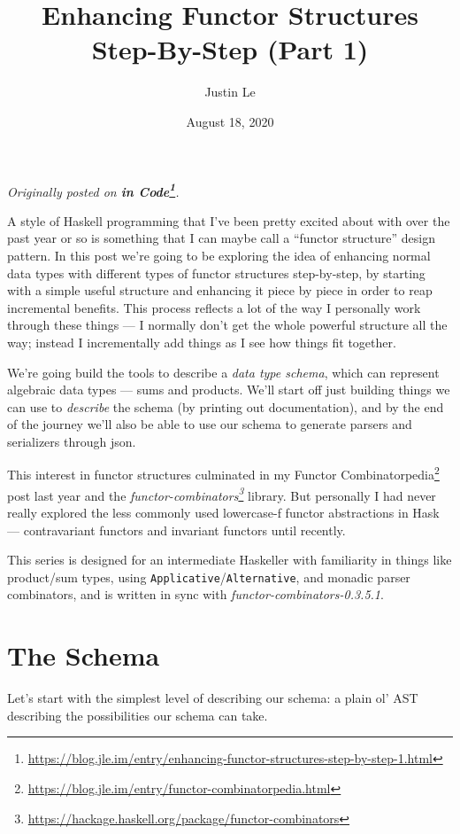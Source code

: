 \documentclass[]{article}
\title{Enhancing Functor Structures Step-By-Step (Part 1)}
\author{Justin Le}
\date{August 18, 2020}
\renewcommand{\href}[2]{#2\footnote{\url{#1}}}
\begin{document}
\maketitle

\emph{Originally posted on
\textbf{\href{https://blog.jle.im/entry/enhancing-functor-structures-step-by-step-1.html}{in
Code}}.}

A style of Haskell programming that I've been pretty excited about with over the
past year or so is something that I can maybe call a ``functor structure''
design pattern. In this post we're going to be exploring the idea of enhancing
normal data types with different types of functor structures step-by-step, by
starting with a simple useful structure and enhancing it piece by piece in order
to reap incremental benefits. This process reflects a lot of the way I
personally work through these things --- I normally don't get the whole powerful
structure all the way; instead I incrementally add things as I see how things
fit together.

We're going build the tools to describe a \emph{data type schema}, which can
represent algebraic data types --- sums and products. We'll start off just
building things we can use to \emph{describe} the schema (by printing out
documentation), and by the end of the journey we'll also be able to use our
schema to generate parsers and serializers through json.

This interest in functor structures culminated in my
\href{https://blog.jle.im/entry/functor-combinatorpedia.html}{Functor
Combinatorpedia} post last year and the
\emph{\href{https://hackage.haskell.org/package/functor-combinators}{functor-combinators}}
library. But personally I had never really explored the less commonly used
lowercase-f functor abstractions in Hask --- contravariant functors and
invariant functors until recently.

This series is designed for an intermediate Haskeller with familiarity in things
like product/sum types, using \texttt{Applicative}/\texttt{Alternative}, and
monadic parser combinators, and is written in sync with
\emph{functor-combinators-0.3.5.1}.

\hypertarget{the-schema}{%
\section{The Schema}\label{the-schema}}

Let's start with the simplest level of describing our schema: a plain ol' AST
describing the possibilities our schema can take.
\end{document}

